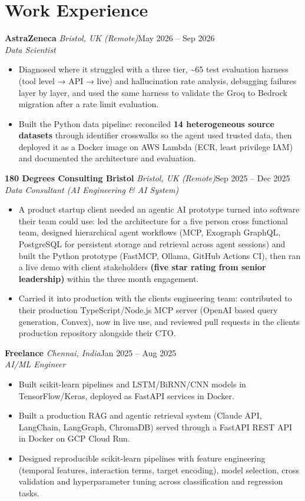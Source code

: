 \documentclass[a4paper,11pt]{article}
\newcommand{\role}[4]{%
  \textbf{#1}{\color{muted}\,\textperiodcentered\,\textit{#2}}\hfill{\color{muted}#3}\\
  \textit{#4}\par}
\newcommand{\gap}{\vspace{5pt}}
\newcommand{\num}[1]{\textbf{#1}}   %
\begin{document}
\section{Work Experience}
\role{AstraZeneca}{Bristol, UK (Remote)}{May 2026 – Sep 2026}{Data Scientist}
\begin{itemize}
  \item Diagnosed where it struggled with a three tier, \textasciitilde{}65 test evaluation harness (tool level → API → live) and hallucination rate analysis, debugging failures layer by layer, and used the same harness to validate the Groq to Bedrock migration after a rate limit evaluation.
  \item Built the Python data pipeline: reconciled \num{14 heterogeneous source datasets} through identifier crosswalks so the agent used trusted data, then deployed it as a Docker image on AWS Lambda (ECR, least privilege IAM) and documented the architecture and evaluation.
\end{itemize}
\gap
{}
\role{180 Degrees Consulting Bristol}{Bristol, UK (Remote)}{Sep 2025 – Dec 2025}{Data Consultant (AI Engineering \& AI System)}
\begin{itemize}
  \item A product startup client needed an agentic AI prototype turned into software their team could use: led the architecture for a five person cross functional team, designed hierarchical agent workflows (MCP, Exograph GraphQL, PostgreSQL for persistent storage and retrieval across agent sessions) and built the Python prototype (FastMCP, Ollama, GitHub Actions CI), then ran a live demo with client stakeholders \num{(five star rating from senior leadership)} within the three month engagement.
  \item Carried it into production with the client\textquotesingle{}s engineering team: contributed to their production TypeScript/Node.js MCP server (OpenAI based query generation, Convex), now in live use, and reviewed pull requests in the client\textquotesingle{}s production repository alongside their CTO.
\end{itemize}
\gap
{}
\role{Freelance}{Chennai, India}{Jan 2025 – Aug 2025}{AI/ML Engineer}
\begin{itemize}
  \item Built scikit-learn pipelines and LSTM/BiRNN/CNN models in TensorFlow/Keras, deployed as FastAPI services in Docker.
  \item Built a production RAG and agentic retrieval system (Claude API, LangChain, LangGraph, ChromaDB) served through a FastAPI REST API in Docker on GCP Cloud Run.
  \item Designed reproducible scikit-learn pipelines with feature engineering (temporal features, interaction terms, target encoding), model selection, cross validation and hyperparameter tuning across classification and regression tasks.
\end{itemize}
\end{document}
